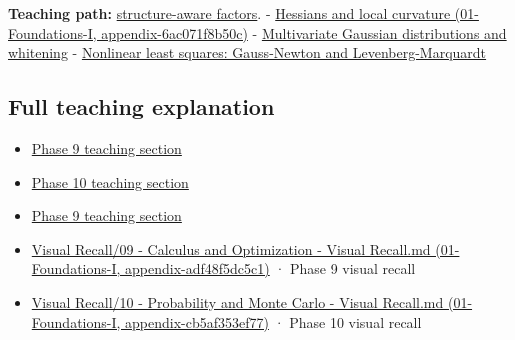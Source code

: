 \textbf{Teaching path:} \href{Continuous\%20Notes/Computing\%20Foundations\%20-\%20From\%20Bits\%20to\%20C++\%20and\%20Systems\%20APIs\#Structure\%20makes\%20a\%20decomposition\%20a\%20better\%20tool\%20than\%20generic\%20elimination}{structure-aware factors}. - \href{}{Hessians and local curvature (01-Foundations-I, appendix-6ac071f8b50c)} - \hyperref[appendix-12bbe185dbe5]{Multivariate Gaussian distributions and whitening} - \hyperref[appendix-2c2df8345991]{Nonlinear least squares: Gauss-Newton and Levenberg-Marquardt}

\subsection{Full teaching explanation}\label{full-teaching-explanation}

\begin{itemize}
\tightlist
\item
  \href{Continuous\%20Notes/Computing\%20Foundations\%20-\%20From\%20Bits\%20to\%20C++\%20and\%20Systems\%20APIs\#Jacobians,\%20curvature,\%20and\%20local\%20approximation}{Phase 9 teaching section}
\item
  \href{Continuous\%20Notes/Computing\%20Foundations\%20-\%20From\%20Bits\%20to\%20C++\%20and\%20Systems\%20APIs\#5.\%20Waiting\%20times,\%20event\%20counts,\%20and\%20covariance\%20geometry}{Phase 10 teaching section}
\item
  \href{Continuous\%20Notes/Computing\%20Foundations\%20-\%20From\%20Bits\%20to\%20C++\%20and\%20Systems\%20APIs\#Optimization\%20and\%20inverse\%20problems}{Phase 9 teaching section}
\item
  \href{}{Visual Recall/09 - Calculus and Optimization - Visual Recall.md (01-Foundations-I, appendix-adf48f5dc5c1)} · Phase 9 visual recall
\item
  \href{}{Visual Recall/10 - Probability and Monte Carlo - Visual Recall.md (01-Foundations-I, appendix-cb5af353ef77)} · Phase 10 visual recall
\end{itemize}

